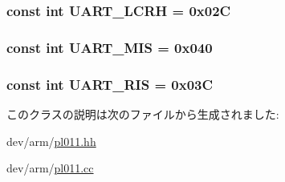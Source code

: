 \label{classPl011_ac02f58b5ec88452b14e2f0f89e0172ee}
\hypertarget{classPl011_aedd23dee902f909a96497e6a46cfe4d1}{
\subsubsection[{UART\_\-LCRH}]{\setlength{\rightskip}{0pt plus 5cm}const int {\bf UART\_\-LCRH} = 0x02C}}
\label{classPl011_aedd23dee902f909a96497e6a46cfe4d1}
\hypertarget{classPl011_a41e42222af27e9de2191fd946e13e55a}{
\subsubsection[{UART\_\-MIS}]{\setlength{\rightskip}{0pt plus 5cm}const int {\bf UART\_\-MIS} = 0x040}}
\label{classPl011_a41e42222af27e9de2191fd946e13e55a}
\hypertarget{classPl011_a3ae85c77ab71dda8e8249f9081be71d8}{
\subsubsection[{UART\_\-RIS}]{\setlength{\rightskip}{0pt plus 5cm}const int {\bf UART\_\-RIS} = 0x03C}}
\label{classPl011_a3ae85c77ab71dda8e8249f9081be71d8}


このクラスの説明は次のファイルから生成されました:\begin{DoxyCompactItemize}
\item 
dev/arm/\hyperlink{pl011_8hh}{pl011.hh}\item 
dev/arm/\hyperlink{pl011_8cc}{pl011.cc}\end{DoxyCompactItemize}
